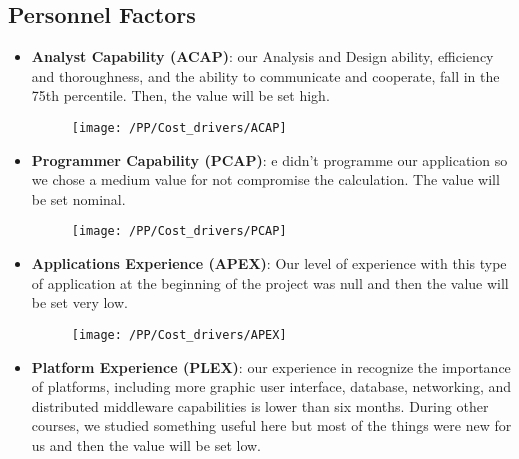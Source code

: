 \subsection{Personnel Factors}
\begin{itemize}
    \item \textbf{Analyst Capability (ACAP)}: our Analysis and Design ability, efficiency and thoroughness, and the ability to communicate and cooperate, fall in the 75th percentile. Then, the value will be set high.
    \begin{figure}[!ht]
      \centering
      \vspace{0.2cm}
      \texttt{[image: /PP/Cost\_drivers/ACAP]}\\
      \vspace{0.2cm}
      \label{fig:ACAP} 
    \end{figure}   
    \item \textbf{Programmer Capability (PCAP)}: e didn't programme our application so we chose a medium value for not compromise the calculation. The value will be set nominal.
    \begin{figure}[!ht]
      \centering
      \vspace{0.2cm}
      \texttt{[image: /PP/Cost\_drivers/PCAP]}\\
      \vspace{0.2cm}
      \label{fig:PCAP} 
    \end{figure}   
    \item \textbf{Applications Experience (APEX)}:  Our level of experience with this type of application at the beginning of the project was null and then the value will be set very low.
    \begin{figure}[!ht]
      \centering
      \vspace{0.2cm}
      \texttt{[image: /PP/Cost\_drivers/APEX]}\\
      \vspace{0.2cm}
      \label{fig:APEX} 
    \end{figure}   
    \item \textbf{Platform Experience (PLEX)}: our experience in recognize the importance of platforms, including more graphic user interface, database, networking, and distributed middleware capabilities is lower than six months. During other courses, we studied something useful here but most of the things were new for us and then the value will be set low.

\end{itemize}

